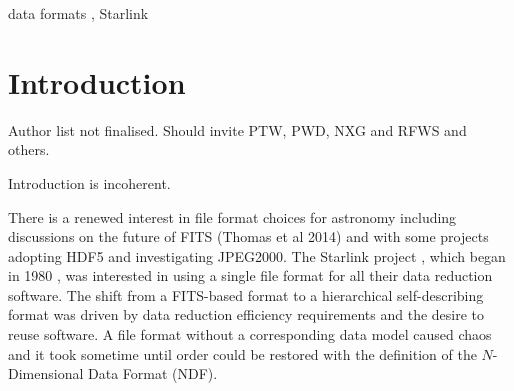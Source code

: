 \documentclass[final,authoryear,5p,times,twocolumn]{elsarticle}
\begin{document}
\begin{frontmatter}
\begin{abstract}
\end{abstract}

\begin{keyword}


data formats \sep
Starlink

\end{keyword}

\end{frontmatter}


\newcommand{\mnras}{Mon Not R Astron Soc}
\newcommand{\aap}{Astron Astrophys}
\newcommand{\aaps}{Astron Astrophys Supp}
\newcommand{\pasp}{Pub Astron Soc Pacific}
\newcommand{\apj}{Astrophys J}
\newcommand{\apjs}{Astrophys J Supp}
\newcommand{\qjras}{Quart J R Astron Soc}
\newcommand{\an}{Astron.\ Nach.}
\newcommand{\ijimw}{Int.\ J.\ Infrared \& Millimeter Waves}
\newcommand{\procspie}{Proc.\ SPIE}
\newcommand{\aspconf}{ASP Conf. Ser.}



\section{Introduction}
\label{sec:intro}

{\color{red} Author list not finalised. Should invite PTW, PWD, NXG
  and RFWS and others.}

{\color{red} Introduction is incoherent.}

There is a renewed interest in file format choices for astronomy
including discussions on the future of FITS (Thomas et al 2014) and
with some projects adopting HDF5 and investigating JPEG2000. The
Starlink project \citep{2000ASSL..250...93W,2002A&G....43a..25P},
which began in 1980 \citep{1982MmSAI..53...55T}, was interested in
using a single file format for all their data reduction software. The
shift from a FITS-based format to a hierarchical self-describing
format was driven by data reduction efficiency requirements and the
desire to reuse software. A file format without a corresponding data
model caused chaos and it took sometime until order could be restored
with the definition of the $N$-Dimensional Data Format (NDF).
\end{document}
